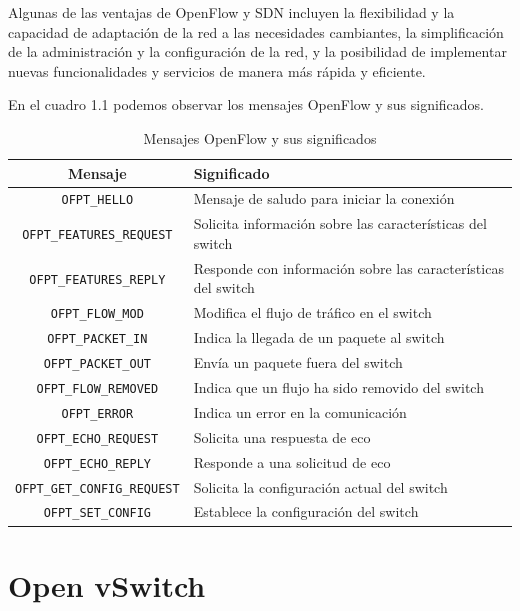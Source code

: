 \documentclass[a4paper, 12pt]{book}
\begin{document}
	
	Algunas de las ventajas de OpenFlow y SDN incluyen la flexibilidad y la capacidad de adaptación de la red a las necesidades cambiantes, la simplificación de la administración y la configuración de la red, y la posibilidad de implementar nuevas funcionalidades y servicios de manera más rápida y eficiente.
	
	En el cuadro 1.1 podemos observar los mensajes OpenFlow y sus significados.
	
	\begin{table}[H] %
		\centering
	
	
		\begin{tabular}{|c|l|}
			\hline
			\textbf{Mensaje} & \textbf{Significado} \\
			\hline
			\texttt{OFPT\_HELLO} & Mensaje de saludo para iniciar la conexión \\
			\hline
			\texttt{OFPT\_FEATURES\_REQUEST} & Solicita información sobre las características del switch \\
			\hline
			\texttt{OFPT\_FEATURES\_REPLY} & Responde con información sobre las características del switch \\
			\hline
			\texttt{OFPT\_FLOW\_MOD} & Modifica el flujo de tráfico en el switch \\
			\hline
			\texttt{OFPT\_PACKET\_IN} & Indica la llegada de un paquete al switch \\
			\hline
			\texttt{OFPT\_PACKET\_OUT} & Envía un paquete fuera del switch \\
			\hline
			\texttt{OFPT\_FLOW\_REMOVED} & Indica que un flujo ha sido removido del switch \\
			\hline
			\texttt{OFPT\_ERROR} & Indica un error en la comunicación \\
			\hline
			\texttt{OFPT\_ECHO\_REQUEST} & Solicita una respuesta de eco \\
			\hline
			\texttt{OFPT\_ECHO\_REPLY} & Responde a una solicitud de eco \\
			\hline
			\texttt{OFPT\_GET\_CONFIG\_REQUEST} & Solicita la configuración actual del switch \\
			\hline
			\texttt{OFPT\_SET\_CONFIG} & Establece la configuración del switch \\
			\hline
		\end{tabular}
		\label{tab:openflow}
		\caption{Mensajes OpenFlow y sus significados}
	\end{table}
	
	\section{Open vSwitch} 
	\label{sec:vswitch}
	
\end{document}
